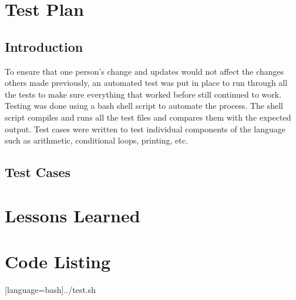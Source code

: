 \documentclass[11pt]{report}
\begin{document}
\chapter{Test Plan}
\section{Introduction}
To ensure that one person's change and updates would not affect the changes others made previously, an automated test was put in place to run through all the tests to make sure everything that worked before still continued to work. Testing was done using a bash shell script to automate the process. The shell script compiles and runs all the test files and compares them with the expected output. Test cases were written to test individual components of the language such as arithmetic, conditional loops, printing, etc.

\section{Test Cases}










\chapter{Lessons Learned}

\appendix
\chapter{Code Listing}






[language=bash]{../test.sh}
\end{document}
